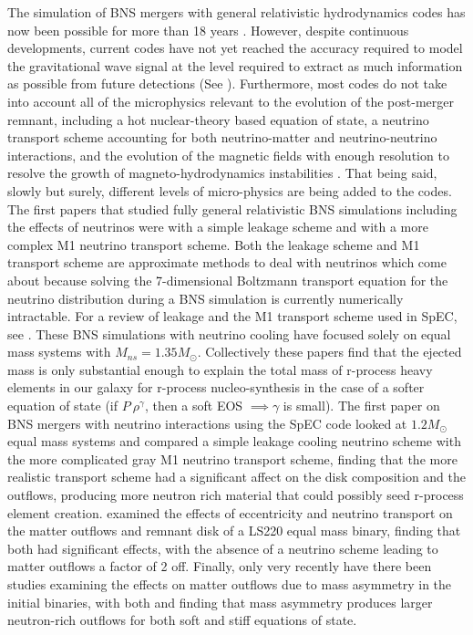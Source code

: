\documentclass{ut-thesis}
\begin{document}
The simulation of BNS mergers with general relativistic hydrodynamics codes has now been possible for more than 18 years \cite{shibata2000simulation}. However, despite continuous developments, current codes have not yet reached the accuracy required to model the gravitational wave signal at the level required to extract as much information as possible from future detections (See \cite{barkett2015gravitational}). Furthermore, most codes do not take into account all of the microphysics relevant to the evolution of the post-merger remnant, including a hot nuclear-theory based equation of state, a neutrino transport scheme accounting for both neutrino-matter and neutrino-neutrino interactions, and the evolution of the magnetic fields with enough resolution to resolve the growth of magneto-hydrodynamics instabilities \cite{foucart2015low}. That being said, slowly but surely, different levels of micro-physics are being added to the codes. The first papers that studied fully general relativistic BNS simulations including the effects of neutrinos
were \cite{neilsen2014magnetized, palenzuela2015effects} with a simple leakage scheme and \cite{sekiguchi2015dynamical} with a more complex M1 neutrino transport scheme. Both the leakage scheme and M1 transport scheme are approximate methods to deal with neutrinos which come about because solving the 7-dimensional Boltzmann transport equation for the neutrino distribution during a BNS simulation is currently numerically intractable. For a review of leakage and the M1 transport scheme used in SpEC, see \cite{foucart2015post}. These BNS simulations with neutrino cooling have focused solely on equal mass systems with $M_{ns} = 1.35M_{\odot}$. Collectively these papers find that the ejected mass is only substantial  enough to explain the total mass of r-process heavy elements in our galaxy for r-process nucleo-synthesis in the case of a softer equation of state (if $P ~ \rho^{\gamma}$, then a soft EOS $\implies \gamma$ is small). The first paper on BNS mergers with neutrino interactions using the SpEC code looked at $1.2M_{\odot}$ equal mass systems and compared a simple leakage cooling neutrino scheme with the more complicated gray M1 neutrino transport scheme, finding that the more realistic transport scheme had a significant affect on the disk composition and the outflows, producing more neutron rich material that could possibly seed r-process element creation. \cite{radice2016dynamical} examined the effects of eccentricity and neutrino transport on the matter outflows and remnant disk of a LS220 equal mass binary, finding that both had significant effects, with the absence of a neutrino scheme leading to matter outflows a factor of 2 off. Finally, only very recently have there been studies examining the effects on matter outflows due to mass asymmetry in the initial binaries, with both \cite{lehner2016unequal} and \cite{sekiguchi2016dynamical} finding that mass asymmetry produces larger neutron-rich outflows for both soft and stiff equations of state.
\end{document}
